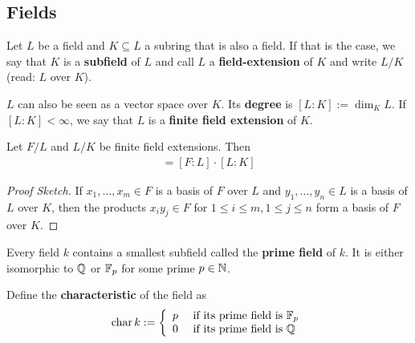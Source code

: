 \subsection{Fields}

\begin{dfn}[]
  Let $L$ be a field and $K \subseteq L$ a subring that is also a field. 
  If that is the case, we say that $K$ is a \textbf{subfield} of $L$ and call $L$ a \textbf{field-extension} of $K$ and write $L/K$ (read: $L$ over $K$).

  $L$ can also be seen as a vector space over $K$. Its \textbf{degree} is $[L:K] := \dim_K L$.
  If $[L:K] < \infty$, we say that $L$ is a \textbf{finite field extension} of $K$.
\end{dfn}

\begin{lem}[]
  Let $F/L$ and $L/K$ be finite field extensions. Then
  \begin{align*}
    [F:K] = [F:L] \cdot [L:K]
  \end{align*}
\end{lem}
\begin{proof}[Proof Sketch]
  If $x_1, \ldots, x_m \in F$ is a basis of $F$ over $L$ and $y_{1}, \ldots, y_{n} \in L$ is a basis of $L$ over $K$, 
  then the products $x_iy_j \in F$ for $1 \leq i \leq m, 1 \leq j \leq n$ form a basis of $F$ over $K$.
\end{proof}

\begin{dfn}[]
  Every field $k$ contains a smallest subfield called the \textbf{prime field} of $k$.
  It is either isomorphic to $\mathbb{Q}$ or $\mathbb{F}_p$ for some prime $p \in \mathbb{N}$.

  Define the \textbf{characteristic} of the field as
  \begin{align*}
    \operatorname{char} k := \left\{\begin{array}{ll}
        p & \text{ if its prime field is } \mathbb{F}_p\\
        0 & \text{ if its prime field is } \mathbb{Q}
    \end{array} \right.
  \end{align*}

\end{dfn}



